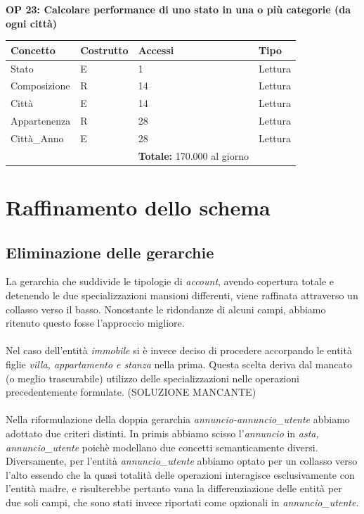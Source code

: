 \documentclass[a4paper,12pt]{report}
\begin{document}
            \textbf{OP 23: Calcolare performance di uno stato in una o più categorie (da ogni città)}
        	\begin{table}[H]
            \centering
             \begin{tabular}{llll}
             \rowcolor{yellow!20} \textbf{Concetto} & \textbf{Costrutto} & \textbf{Accessi} & \textbf{Tipo}\\ [0.5ex] 
             \hline
             Stato & E & 1 & Lettura \\ 
             Composizione & R & 14 & Lettura \\ 
             Città & E & 14 & Lettura \\ 
             Appartenenza & R & 28 & Lettura \\ 
             Città\_Anno & E & 28 & Lettura \\ 
             \hline
                \rowcolor{yellow!20} &   & \textbf{Totale:}  170.000 al giorno &  \\ [1ex] 
             
             \end{tabular}
            \end{table}
        
        \section{Raffinamento dello schema}
            \subsection*{Eliminazione delle gerarchie}
                La gerarchia che suddivide le tipologie di \textit{account}, avendo copertura totale e
                detenendo le due specializzazioni mansioni differenti, viene raffinata
                attraverso un collasso verso il basso. Nonostante le ridondanze di alcuni campi,
                abbiamo ritenuto questo fosse l'approccio migliore.\\
                \\
                Nel caso dell'entità \textit{immobile} si è invece deciso di procedere accorpando le
                entità figlie \textit{villa, appartamento e stanza} nella prima. Questa scelta deriva
                dal mancato (o meglio trascurabile) utilizzo delle specializzazioni nelle operazioni
                precedentemente formulate. (SOLUZIONE MANCANTE)\\
                \\
                Nella riformulazione della doppia gerarchia \textit{annuncio-annuncio\_utente} abbiamo
                adottato due criteri distinti. In primis abbiamo scisso l'\textit{annuncio} in 
                \textit{asta, annuncio\_utente} poichè modellano due concetti semanticamente diversi.
                Diversamente, per l'entità \textit{annuncio\_utente} abbiamo optato per un collasso verso
                l'alto essendo che la quasi totalità delle operazioni interagisce esclusivamente con l'entità 
                madre, e risulterebbe pertanto vana la differenziazione delle entità per due soli campi, che 
                sono stati invece riportati come opzionali in \textit{annuncio\_utente}.
\end{document}
